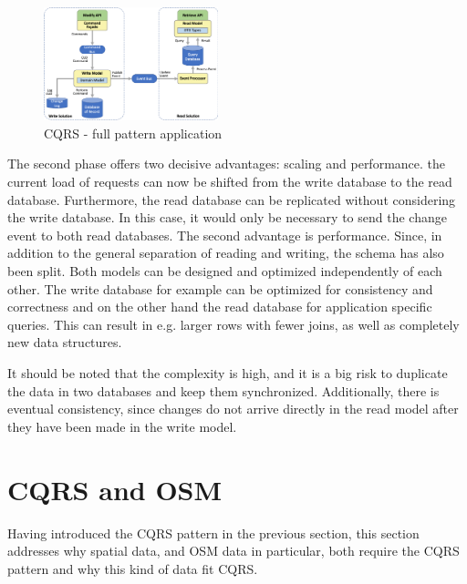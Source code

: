 \documentclass[conference]{IEEEtran}
\begin{document}
\begin{figure}[h]
    \centering
    \includegraphics[width=0.45\textwidth]{figures/cqrs_full}
    \caption{CQRS - full pattern application \cite{IBM_cqrs_2021}}
    \label{fig:cqrs_full}
\end{figure}


\newpage


The second phase offers two decisive advantages: scaling and performance. the current load of requests can now be shifted from the write database to the read database. Furthermore, the read database can be replicated without considering the write database. In this case, it would only be necessary to send the change event to both read databases. The second advantage is performance. Since, in addition to the general separation of reading and writing, the schema has also been split. Both models can be designed and optimized independently of each other. The write database for example can be optimized for consistency and correctness and on the other hand the read database for application specific queries. This can result in e.g. larger rows with fewer joins, as well as completely new data structures. \cite{IBM_cqrs_2021}

It should be noted that the complexity is high, and it is a big risk to duplicate the data in two databases and keep them synchronized. Additionally, there is eventual consistency, since changes do not arrive directly in the read model after they have been made in the write model. \cite{noauthor_microservice_nodate}

\section{CQRS and OSM}
\label{sec:cqrs_osm}
Having introduced the CQRS pattern in the previous section, this section addresses why spatial data, and OSM data in particular, both require the CQRS pattern and why this kind of data fit CQRS.
\end{document}
